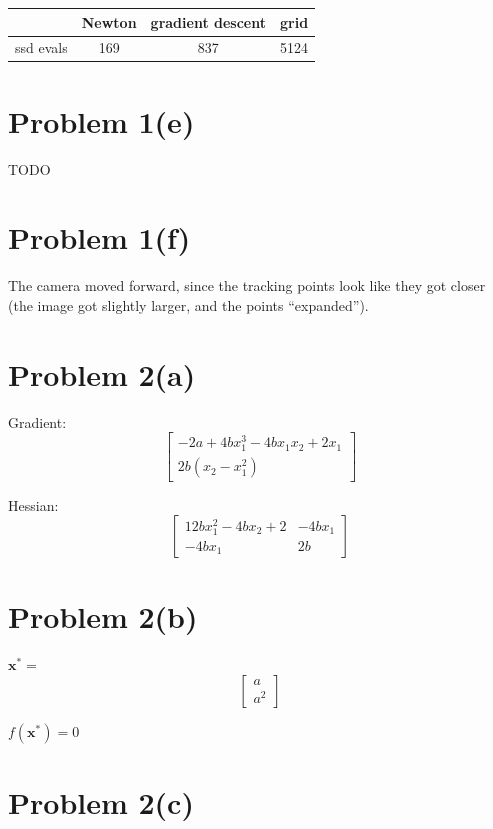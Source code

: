 \documentclass{article}
\begin{document}
\begin{center}
\begin{tabular}{ ||c|c|c|c|| } 
	\hline
				& Newton & gradient descent & grid \\ \hline
	ssd evals 	& 169 & 837 & 5124\\

\hline
\end{tabular}
\end{center}

\section*{Problem 1(e)}

TODO

\section*{Problem 1(f)}

The camera moved forward, since the tracking points look like they got closer (the image got slightly larger, and the points ``expanded'').

\section*{Problem 2(a)}

\begin{center}
Gradient:
\[
	\begin{bmatrix}
		-2a + 4bx_1^3 -4bx_1x_2 + 2x_1\\ 
		2b(x_2-x_1^2)
	\end{bmatrix}
\]

Hessian:
\[
	\begin{bmatrix}
		12bx_1^2-4bx_2+2 & -4bx_1\\
		-4bx_1 & 2b 
	\end{bmatrix}
\]
\end{center}

\section*{Problem 2(b)}


$\mathbf{x^{*}} = $
\[
	\begin{bmatrix}
		a \\
		a^2
	\end{bmatrix}
\]

$f(\mathbf{x^{*}}) = 0$
	

\section*{Problem 2(c)}
\end{document}
